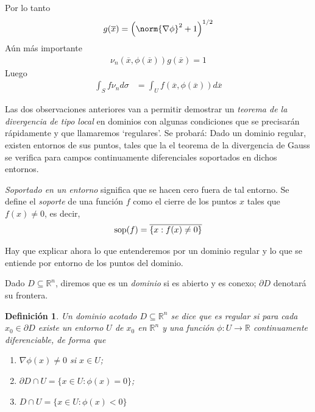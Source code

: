 \documentclass{report}
\newcommand{\realNumbers}{\mathbb{R}}
\newtheorem{definition}{Definición}
\theoremstyle{remark}
\DeclareMathOperator{\support}{\textnormal{sop}}
\begin{document}
  Por lo tanto
  \begin{align}
    g(\overline{x})
    =
    \left( \norm{\nabla \phi}^2 + 1 \right)^{1 / 2}
  \end{align}
  Aún más importante
  \begin{align}
    \nu_n(\overline{x}, \phi(\overline{x}))
    g(\overline{x})
    =
    1
  \end{align}
  Luego
  \begin{align}
    \int_S f \nu_n d \sigma
    &=
    \int_U
      f(\overline{x}, \phi(\overline{x}))
    d \overline{x}
  \end{align}

  \newpage
  Las dos observaciones anteriores van a permitir demostrar un \emph{teorema de la divergencia de tipo local} en dominios con algunas condiciones que se precisarán rápidamente y que llamaremos `regulares'.
  Se probará:
  Dado un dominio regular, existen entornos de sus puntos, tales que la el teorema de la divergencia de Gauss se verifica para campos continuamente diferenciales soportados en dichos entornos.

  \emph{Soportado en un entorno} significa que se hacen cero fuera de tal entorno.
  Se define el \emph{soporte} de una función \(f\) como el cierre de los puntos \(x\) tales que \(f(x) \neq 0\), es decir,
  \begin{align}
    \support(f)
    =
    \overline{\{x : f(x) \neq 0\}}
  \end{align}

  Hay que explicar ahora lo que entenderemos por un dominio regular y lo que se entiende por entorno de los puntos del dominio.

  Dado \(D \subseteq \realNumbers^n\), diremos que es un \emph{dominio} si es abierto y es conexo;
  \(\partial D\) denotará su frontera.

  \begin{definition}
    Un dominio acotado \(D \subseteq \realNumbers^n\) se dice que es regular si para cada \(x_0 \in \partial D\) existe un entorno \(U\) de \(x_0\) en \(\realNumbers^n\) y una función \(\phi : U \rightarrow \realNumbers\) continuamente diferenciable, de forma que
    \begin{enumerate}
      \item \(\nabla \phi(x) \neq 0\) si \(x \in U\);
      \item \(\partial D \cap U = \{x \in U : \phi(x) = 0\}\);
      \item \(D \cap U = \{x \in U : \phi(x) < 0\}\)
    \end{enumerate}
  \end{definition}
\end{document}
